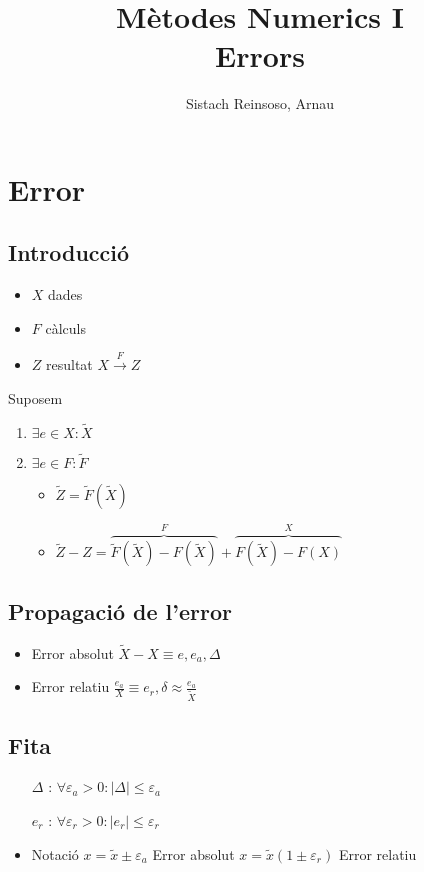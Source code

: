 \documentclass{article}
\title{Mètodes Numerics I\\ Errors}
\author{Sistach Reinsoso, Arnau}
\begin{document}
\maketitle
\tableofcontents

\section{Error}
\subsection{Introducció}
\begin{itemize}
\item $X$ dades
\item $F$ càlculs
\item $Z$ resultat
	\subitem $X \xrightarrow{F} Z$
\end{itemize}

Suposem
\begin{enumerate}
\item $\exists e \in X: \widetilde{X}$
\item $\exists e \in F: \widetilde{F}$
	\begin{itemize}
	\item $\widetilde{Z} = \widetilde{F} (\widetilde{X})$
	\item $\widetilde{Z} - Z =
		\overbrace{\widetilde{F}(\widetilde{X}) -
			F(\widetilde{X})}^F +
		\overbrace{F(\widetilde{X}) - F(X)}^X$
	\end{itemize}
\end{enumerate}


\subsection{Propagació de l'error}
\begin{itemize}
\item Error absolut
	\subitem $\widetilde{X} - X \equiv e, e_a, \Delta$
\item Error relatiu
	\subitem $\frac{e_a}{X} \equiv e_r, \delta \approx \frac{e_a}{\widetilde{X}}$
\end{itemize}
\subsection{Fita}
\begin{itemize}
\item[$\Delta$]: $\forall \varepsilon_a > 0: |\Delta| \le \varepsilon_a$
\item[$e_r$]: $\forall \varepsilon_r > 0: |e_r| \le \varepsilon_r$
\item Notació
	\subitem $x = \tilde{x} \pm \varepsilon_a$ Error absolut
	\subitem $x = \tilde{x} (1 \pm \varepsilon_r)$ Error relatiu
\end{itemize}
\end{document}
